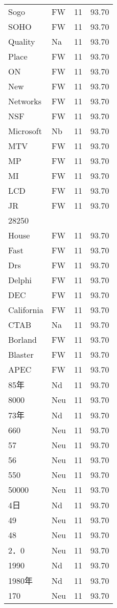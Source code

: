 \documentclass[twocolumn]{book}
\begin{document}
\begin{supertabular}{llrr}
Sogo & FW & 11 &  93.70\\
SOHO & FW & 11 &  93.70\\
Quality & Na & 11 &  93.70\\
Place & FW & 11 &  93.70\\
ON & FW & 11 &  93.70\\
New & FW & 11 &  93.70\\
Networks & FW & 11 &  93.70\\
NSF & FW & 11 &  93.70\\
Microsoft & Nb & 11 &  93.70\\
MTV & FW & 11 &  93.70\\
MP & FW & 11 &  93.70\\
MI & FW & 11 &  93.70\\
LCD & FW & 11 &  93.70\\
JR & FW & 11 &  93.70\\
28250\\
House & FW & 11 &  93.70\\
Fast & FW & 11 &  93.70\\
Drs & FW & 11 &  93.70\\
Delphi & FW & 11 &  93.70\\
DEC & FW & 11 &  93.70\\
California & FW & 11 &  93.70\\
CTAB & Na & 11 &  93.70\\
Borland & FW & 11 &  93.70\\
Blaster & FW & 11 &  93.70\\
APEC & FW & 11 &  93.70\\
85年 & Nd & 11 &  93.70\\
8000 & Neu & 11 &  93.70\\
73年 & Nd & 11 &  93.70\\
660 & Neu & 11 &  93.70\\
57 & Neu & 11 &  93.70\\
56 & Neu & 11 &  93.70\\
550 & Neu & 11 &  93.70\\
50000 & Neu & 11 &  93.70\\
4日 & Nd & 11 &  93.70\\
49 & Neu & 11 &  93.70\\
48 & Neu & 11 &  93.70\\
2．0 & Neu & 11 &  93.70\\
1990 & Nd & 11 &  93.70\\
1980年 & Nd & 11 &  93.70\\
170 & Neu & 11 &  93.70\\

\end{supertabular}
\end{document}
